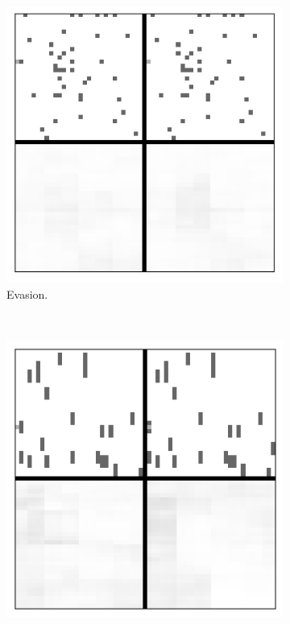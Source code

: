 \begin{figure}[t!]
	\centering
	\begin{subfigure}{0.3\columnwidth}
		\centering
		\includegraphics[width=\linewidth]{documentation/report/img/janus_scroll_evasion.png}
		\caption{Evasion.}
		\label{subfig:janus_scroll_race}
	\end{subfigure}%
	~ 
	\begin{subfigure}{0.3\columnwidth}
		\centering
		\includegraphics[width=\linewidth]{documentation/report/img/janus_scroll_walls.png}

\end{subfigure}
\end{figure}

